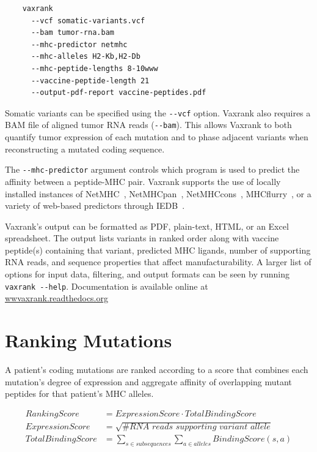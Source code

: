 \documentclass[10pt,letterpaper]{article}
\begin{document}
\vspace{1ex}
\begin{verbatim}
    vaxrank
      --vcf somatic-variants.vcf
      --bam tumor-rna.bam
      --mhc-predictor netmhc
      --mhc-alleles H2-Kb,H2-Db
      --mhc-peptide-lengths 8-10www
      --vaccine-peptide-length 21
      --output-pdf-report vaccine-peptides.pdf
\end{verbatim}
\vspace{1ex}

Somatic variants can be specified using the \verb|--vcf| option. Vaxrank also requires a BAM file of aligned tumor RNA reads (\verb|--bam|). This allows Vaxrank to both quantify tumor expression of each mutation and to phase adjacent variants when reconstructing a mutated coding sequence.

The \verb|--mhc-predictor| argument controls which program is used to predict the affinity between a peptide-MHC pair. Vaxrank supports the use of locally installed instances of NetMHC~\citep{netmhc2016}, NetMHCpan~\citep{netmhcpan2007}, NetMHCcons~\citep{netmhccons}, MHCflurry~\citep{mhcflurry}, or a variety of web-based predictors through IEDB~\citep{iedb}. 

Vaxrank's output can be formatted as PDF, plain-text, HTML, or an Excel spreadsheet. The output lists variants in ranked order along with vaccine peptide(s) containing that variant, predicted MHC ligands, number of supporting RNA reads, and sequence properties that affect manufacturability. A larger list of options for input data, filtering, and output formats can be seen by running \verb|vaxrank --help|. Documentation is available online at \href{http://vaxrank.readthedocs.io}{wwvaxrank.readthedocs.org}

\section{Ranking Mutations}
A patient's coding mutations are ranked according to a score that combines each mutation's degree of expression and aggregate affinity of overlapping mutant peptides for that patient's MHC alleles.

\begin{align*}
\textit{RankingScore} 		&= \textit{ExpressionScore} \cdot \textit{TotalBindingScore} \\
\textit{ExpressionScore} 	&= \sqrt{\textit{\# RNA reads supporting variant allele}} \\
\textit{TotalBindingScore} 		&= \sum_{s \in \textit{subsequences}}\sum_{a \in \textit{alleles}}\textit{BindingScore}(s, a)
\end{align*}
\end{document}
